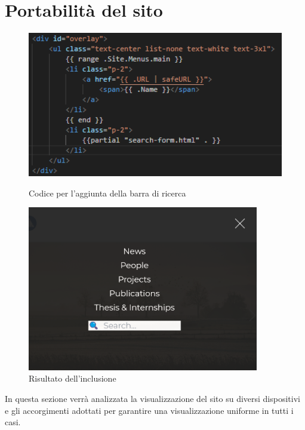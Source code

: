 \documentclass[target=bach,aauheader=]{thud}
\begin{document}
\section{Portabilità del sito}
\begin{figure}
    \begin{minipage}{0.5\textwidth}
      \centering
      \includegraphics[width=1\textwidth]{images/header.png}
      \caption{Codice per l'aggiunta della barra di ricerca}
      \label{img:header}
    \end{minipage}
    \begin{minipage}{0.5\textwidth}
      \centering
      \includegraphics[width = 0.9\textwidth]{images/menu-hamburger.png}
      \caption{Risultato dell'inclusione}
      \label{img:hamburger}
    \end{minipage}
\end{figure}
In questa sezione verrà analizzata la visualizzazione del sito su diversi dispositivi e gli accorgimenti adottati per garantire una visualizzazione uniforme in tutti i casi. 
\end{document}
